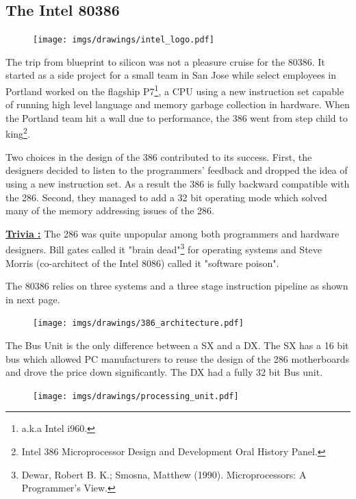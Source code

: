 \documentclass[book.tex]{subfiles}
\begin{document}
\subsection{The Intel 80386}
  \begin{figure}
\centering
\vspace{-10pt}
\texttt{[image: imgs/drawings/intel\_logo.pdf]}
\end{figure}
The trip from blueprint to silicon was not a pleasure cruise for the 80386. It started as a side project for a small team in San Jose while select employees in Portland worked on the flagship P7\footnote{a.k.a Intel i960.}, a CPU using a new instruction set capable of running high level language and memory garbage collection in hardware. When the Portland team hit a wall due to performance, the 386 went from step child to king\footnote{Intel 386 Microprocessor Design and Development Oral History Panel.}.\\
\par
Two choices in the design of the 386 contributed to its success. First, the designers decided to listen to the programmers' feedback and dropped the idea of using a new instruction set. As a result the 386 is fully backward compatible with the 286. Second, they managed to add a 32 bit operating mode which solved many of the memory addressing issues of the 286.\\
\par
\textbf{\underline{Trivia :}}  The 286 was quite unpopular among both programmers and hardware designers. Bill gates called it "brain dead"\footnote{Dewar, Robert B. K.; Smosna, Matthew (1990). Microprocessors: A Programmer's View.} for operating systems and Steve Morris (co-architect of the Intel 8086) called it "software poison".\\
\par
The 80386 relies on three systems and a three stage instruction pipeline as shown in next page.\\
\par
\begin{figure}[H]
\centering
\texttt{[image: imgs/drawings/386\_architecture.pdf]}
\end{figure}
\par
The Bus Unit is the only difference between a SX and a DX. The SX has a 16 bit bus which allowed PC manufacturers to reuse the design of the 286 motherboards and drove the price down significantly. The DX had a fully 32 bit Bus unit.
\par
\begin{figure}[H]
\centering
\texttt{[image: imgs/drawings/processing\_unit.pdf]}
\end{figure}
\end{document}
